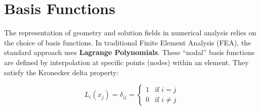 \documentclass[12pt,report,justified]{SANDreport}
\begin{document}
% 
% 
% 
% 
% 
% 
% 

\appendix
\chapter{Basis Functions}
\label{appendix:basis}

The representation of geometry and solution fields in numerical analysis relies on the choice of basis functions. In traditional Finite Element Analysis (FEA), the standard approach uses {\bf Lagrange Polynomials}. These ``nodal'' basis functions are defined by interpolation at specific points (nodes) within an element. They satisfy the Kronecker delta property:

\begin{equation}
L_i(x_j) = \delta_{ij} = \begin{cases} 1 & \text{if } i = j \\ 0 & \text{if } i \neq j \end{cases}
\label{eq:kronecker}
\end{equation}
\end{document}
